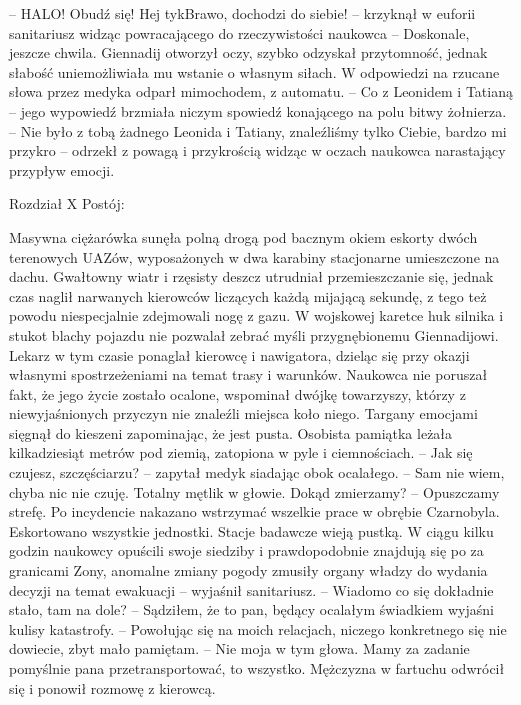 \documentclass[../MAIN.tex]{subfiles}
\begin{document}
-- HALO! Obudź się! Hej ty\3kBrawo, dochodzi do siebie! -- krzyknął w euforii sanitariusz widząc powracającego do rzeczywistości naukowca -- Doskonale, jeszcze chwila. 
Giennadij otworzył oczy, szybko odzyskał przytomność, jednak słabość uniemożliwiała mu wstanie o własnym siłach. W odpowiedzi na rzucane słowa przez medyka odparł mimochodem, z automatu.
-- Co z Leonidem i Tatianą -- jego wypowiedź brzmiała niczym spowiedź konającego na polu bitwy żołnierza. 
-- Nie było z tobą żadnego Leonida i Tatiany, znaleźliśmy tylko Ciebie, bardzo mi przykro -- odrzekł z powagą i przykrością widząc w oczach naukowca narastający przypływ emocji.


Rozdział X
Postój:  

Masywna ciężarówka sunęła polną drogą pod bacznym okiem eskorty dwóch terenowych UAZów, wyposażonych w dwa karabiny stacjonarne umieszczone na dachu. Gwałtowny wiatr i rzęsisty deszcz utrudniał przemieszczanie się, jednak czas naglił narwanych kierowców liczących każdą mijającą sekundę, z tego też powodu niespecjalnie zdejmowali nogę z gazu. W wojskowej karetce huk silnika i stukot blachy pojazdu nie pozwalał zebrać myśli przygnębionemu Giennadijowi. Lekarz w tym czasie ponaglał kierowcę i nawigatora, dzieląc się przy okazji własnymi spostrzeżeniami na temat trasy i warunków. Naukowca nie poruszał fakt, że jego życie zostało ocalone, wspominał dwójkę towarzyszy, którzy z niewyjaśnionych przyczyn nie znaleźli miejsca koło niego. Targany emocjami sięgnął do kieszeni zapominając, że jest pusta. Osobista pamiątka leżała kilkadziesiąt metrów pod ziemią, zatopiona w pyle i ciemnościach. 
-- Jak się czujesz, szczęściarzu? -- zapytał medyk siadając obok ocalałego. 
-- Sam nie wiem, chyba nic nie czuję. Totalny mętlik w głowie. Dokąd zmierzamy? 
-- Opuszczamy strefę. Po incydencie nakazano wstrzymać wszelkie prace w obrębie Czarnobyla. Eskortowano wszystkie jednostki. Stacje badawcze wieją pustką. W ciągu kilku godzin naukowcy opuścili swoje siedziby i prawdopodobnie znajdują się po za granicami Zony, anomalne zmiany pogody zmusiły organy władzy do wydania decyzji na temat ewakuacji -- wyjaśnił sanitariusz.
-- Wiadomo co się dokładnie stało, tam na dole? 
-- Sądziłem, że to pan, będący ocalałym świadkiem wyjaśni kulisy katastrofy. 
-- Powołując się na moich relacjach, niczego konkretnego się nie dowiecie, zbyt mało pamiętam. 
-- Nie moja w tym głowa. Mamy za zadanie pomyślnie pana przetransportować, to wszystko.
Mężczyzna w fartuchu odwrócił się i ponowił rozmowę z kierowcą.
\end{document}
